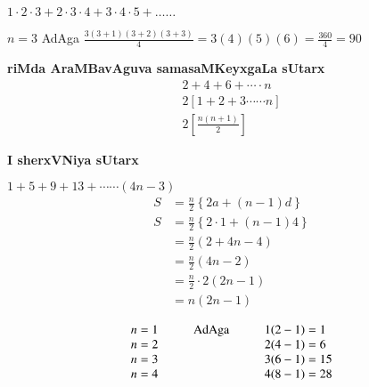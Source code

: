 $1 \cdot 2 \cdot 3 +2 \cdot 3 \cdot 4+ 3 \cdot 4 \cdot 5 +\ldots\ldots $

\medskip
$n=3$ AdAga \qquad $\frac{3(3+1)(3+2)(3+3)}{4} = 3(4)(5)(6)=\frac{360}{4}=90$

\textbf{ riMda AraMBavAguva samasaMKeyxgaLa sUtarx}
\begin{gather*}
2+4+6+ \cdots\cdot n\\
2[1+2+3\cdots\cdots n]\\
2\left[\frac{n(n+1)}{2}\right]
\end{gather*}

\textbf{I sherxVNiya sUtarx}

$1+5+9+13+ \cdots\cdots (4n-3)$
\begin{align*}
S &=\frac{n}{2}\left\{2a+(n-1)d\right\}\\
S &=\frac{n}{2}\left\{2\cdot 1 +(n-1)4\right\}\\
  &=\frac{n}{2}\left( 2 +4n-4\right)\\
  &=\frac{n}{2}(4n-2)\\
  &=\frac{n}{2}\cdot 2(2n -1)\\
  &=n(2n-1)
\end{align*}

$$
\begin{array}{c@{\hspace{1cm}}c@{\hspace{1cm}}l}
n=1 & \text{AdAga} & 1(2-1)=1\\
n=2 &              & 2(4-1)=6\\
n=3 &              & 3(6-1)=15\\
n=4 &              & 4(8-1)=28
\end{array}
$$

